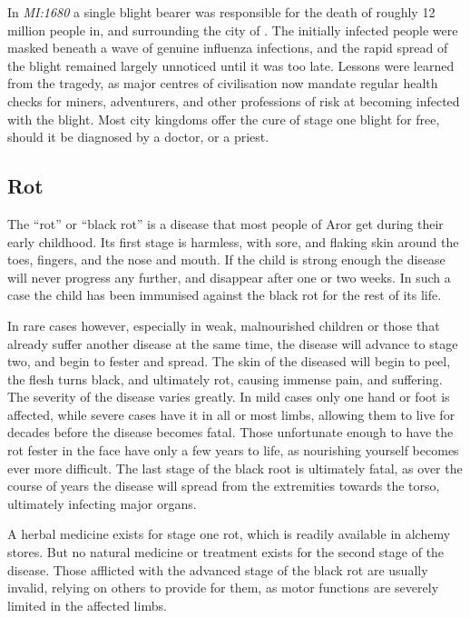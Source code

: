 In \emph{MI:1680} a single blight bearer was responsible for the death of
roughly 12 million people in, and surrounding the city of
. The initially infected people were masked beneath a
wave of genuine influenza infections, and the rapid spread of the blight
remained largely unnoticed until it was too late. Lessons were learned from
the tragedy, as major centres of civilisation now mandate regular health
checks for miners, adventurers, and other professions of risk at becoming
infected with the blight. Most city kingdoms offer the cure of stage one
blight for free, should it be diagnosed by a doctor, or a priest.

\subsection{Rot}
\label{sec:Rot}

The ``rot'' or ``black rot'' is a disease that most people of Aror get during
their early childhood. Its first stage is harmless, with sore, and flaking
skin around the toes, fingers, and the nose and mouth. If the child is strong
enough the disease will never progress any further, and disappear after one or
two weeks. In such a case the child has been immunised against the black rot
for the rest of its life.

In rare cases however, especially in weak, malnourished children or those that
already suffer another disease at the same time, the disease will advance to
stage two, and begin to fester and spread. The skin of the diseased will begin
to peel, the flesh turns black, and ultimately rot, causing immense pain, and
suffering. The severity of the disease varies greatly. In mild cases only one
hand or foot is affected, while severe cases have it in all or most limbs,
allowing them to live for decades before the disease becomes fatal. Those
unfortunate enough to have the rot fester in the face have only a few years to
life, as nourishing yourself becomes ever more difficult. The last stage of
the black root is ultimately fatal, as over the course of years the disease
will spread from the extremities towards the torso, ultimately infecting major
organs.

A herbal medicine exists for stage one rot, which is readily available in
alchemy stores. But no natural medicine or treatment exists for the second
stage of the disease. Those afflicted with the advanced stage of the black rot
are usually invalid, relying on others to provide for them, as motor functions
are severely limited in the affected limbs.

